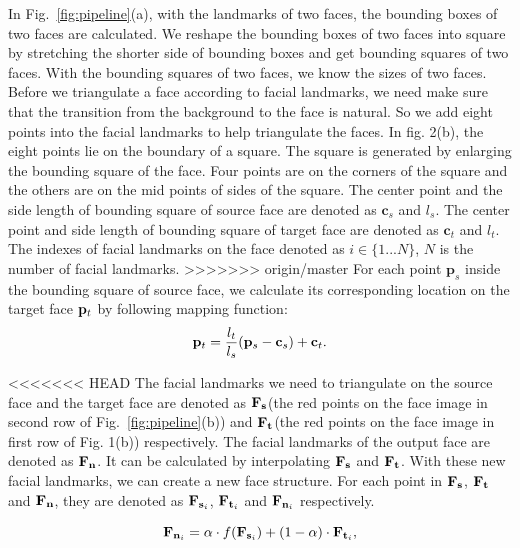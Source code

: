 In Fig.~\ref{fig:pipeline}(a), with the landmarks of two faces, the bounding boxes of two faces are calculated. 
We reshape the bounding boxes of two faces into square by stretching the shorter side of bounding boxes and get bounding squares of two faces. 
With the bounding squares of two faces, we know the sizes of two faces.
%
% 
Before we triangulate a face according to facial landmarks, we need make sure that the transition from the background to the face is natural. 
%
So we add eight points into the facial landmarks to help triangulate the faces. In fig. 2(b), the eight points lie on the boundary of a square. The square is generated by enlarging the bounding square of the face. Four points are on the corners of the square and the others are on the mid points of sides of the square. 
%
The center point and the side length of bounding square of source face are denoted as $\mathbf{c}_s$ and $l_s$. 
The center point and side length of bounding square of target face are denoted as $\mathbf{c}_t$ and $l_t$.
% 
The indexes of facial landmarks on the face denoted as $i \in \{1...N\}$, $N$ is the number of facial landmarks. 
>>>>>>> origin/master
For each point $\mathbf{p}_s$ inside the bounding square of source face, we calculate its corresponding location on the target face $\mathbf{p}_t$ by following mapping function:
%
\begin{equation}
\label{eq:trans-point}
\mathbf{p}_t=\frac{l_t}{l_s}(\mathbf{p}_s-\mathbf{c}_s) + \mathbf{c}_t.
\end{equation}

<<<<<<< HEAD
The facial landmarks we need to triangulate on the source face and the target face are denoted as $\mathbf{F_{s}}$(the red points on the face image in second row of Fig.~\ref{fig:pipeline}(b)) and $\mathbf{F_{t}}$(the red points on the face image in first row of Fig. 1(b)) respectively.
The facial landmarks of the output face are denoted as $\mathbf{F_n}$. It can be calculated by interpolating $\mathbf{F_s}$ and $\mathbf{F_t}$. With these new facial landmarks, we can create a new face structure. For each point in $\mathbf{F_s}$, $\mathbf{F_t}$ and $\mathbf{F_n}$, they are denoted as $\mathbf{F}_{\mathbf{s}_i}$, $\mathbf{F}_{\mathbf{t}_i}$ and $\mathbf{F}_{\mathbf{n}_i}$ respectively.

\begin{equation}
\label{eq:inp-point}
\mathbf{F}_{\mathbf{n}_i} = \alpha \cdot f(\mathbf{F}_{\mathbf{s}_i}) + (1-\alpha) \cdot \mathbf{F}_{\mathbf{t}_i},
\end{equation}

